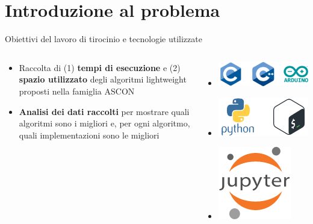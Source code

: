 \section{Introduzione al problema}


\begin{frame}{Obiettivi del lavoro di tirocinio e tecnologie utilizzate}

\begin{columns}

\begin{column}{0.5\textwidth}

\begin{itemize}[<+->]
    \item Raccolta di (1) \textbf{tempi di esecuzione} e (2) \textbf{spazio utilizzato} degli algoritmi lightweight proposti nella famiglia ASCON
    \item \textbf{Analisi dei dati raccolti} per mostrare quali algoritmi sono i migliori e, per ogni algoritmo, quali implementazioni sono le migliori
\end{itemize}

\end{column}

\begin{column}{0.5\textwidth}
    
\begin{itemize}[<+->]
    \item[] \includegraphics[height=0.15\textwidth]{images/board.png} \vspace{0.5cm}
    \item[] \includegraphics[height=0.15\textwidth]{images/automation.png} \vspace{0.5cm}
    \item[] \includegraphics[height=0.15\textwidth]{images/plot.png}
\end{itemize}

\end{column}

\end{columns}

\end{frame}

